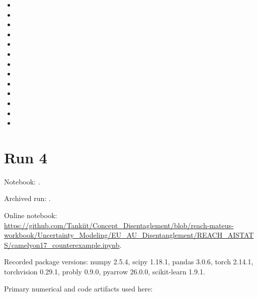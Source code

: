 \begin{itemize}

\item {}

\item {}

\item {}

\item {}

\item {}

\item {}

\item {}

\item {}

\item {}

\item {}

\item {}

\item {}

\item {}

\end{itemize}

\section{Run 4}

Notebook: .

Archived run: .

Online notebook: \url{https://github.com/Tankiit/Concept_Disentaglement/blob/reach-mateus-workbook/Uncertainty_Modeling/EU_AU_Disentanglement/REACH_AISTATS/camelyon17_counterexample.ipynb}.

Recorded package versions: numpy 2.5.4, scipy 1.18.1, pandas 3.0.6, torch 2.14.1, torchvision 0.29.1, probly 0.9.0, pyarrow 26.0.0, scikit-learn 1.9.1.

Primary numerical and code artifacts used here:

